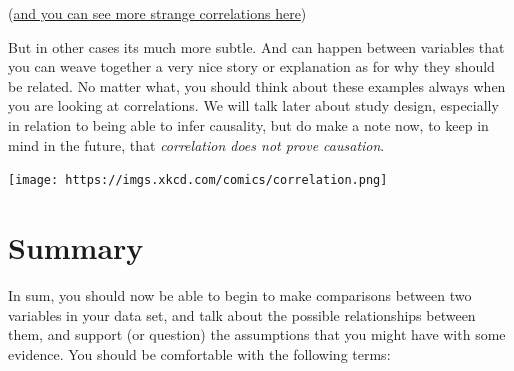 \documentclass[
]{book}
\begin{document}
(\href{http://www.tylervigen.com/spurious-correlations}{and you can see more strange correlations here})

But in other cases its much more subtle. And can happen between variables that you can weave together a very nice story or explanation as for why they should be related. No matter what, you should think about these examples always when you are looking at correlations. We will talk later about study design, especially in relation to being able to infer causality, but do make a note now, to keep in mind in the future, that \emph{correlation does not prove causation}.

\texttt{[image: https://imgs.xkcd.com/comics/correlation.png]}

\hypertarget{summary-2}{%
\section{Summary}\label{summary-2}}

In sum, you should now be able to begin to make comparisons between two variables in your data set, and talk about the possible relationships between them, and support (or question) the assumptions that you might have with some evidence. You should be comfortable with the following terms:
\end{document}
